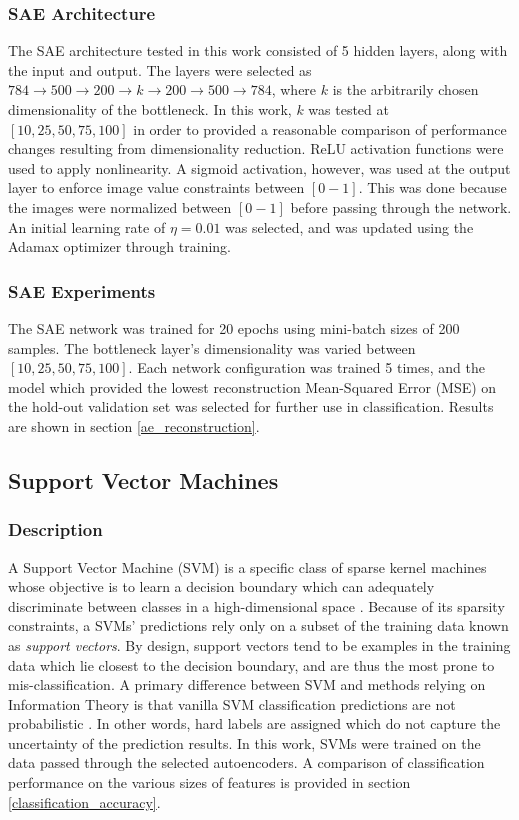 \documentclass[conference]{IEEEtran}
\begin{document}
  	\subsubsection*{SAE Architecture}
  	The SAE architecture tested in this work consisted of 5 hidden layers, along with the input and output.  The layers were selected as $784 \rightarrow 500 \rightarrow 200 \rightarrow k \rightarrow 200 \rightarrow 500 \rightarrow 784$, where $k$ is the arbitrarily chosen dimensionality of the bottleneck.  In this work, $k$ was tested at $[10,25,50,75,100]$ in order to provided a reasonable comparison of performance changes resulting from dimensionality reduction.  ReLU activation functions were used to apply nonlinearity.  A sigmoid activation, however, was used at the output layer to enforce image value constraints between $[0-1]$.  This was done because the images were normalized between $[0-1]$ before passing through the network.  An initial learning rate of $\eta=0.01$ was selected, and was updated using the Adamax optimizer through training.
  	
  	\subsubsection*{SAE Experiments}
  	The SAE network was trained for 20 epochs using mini-batch sizes of 200 samples.  The bottleneck layer's dimensionality was varied between $[10,25,50,75,100]$.  Each network configuration was trained 5 times, and the model which provided the lowest reconstruction  Mean-Squared Error (MSE) on the hold-out validation set was selected for further use in classification.  Results are shown in section \ref{ae_reconstruction}.
  	
	 \subsection{Support Vector Machines}
	 \subsubsection*{Description}
	 A Support Vector Machine (SVM) is a specific class of sparse kernel machines whose objective  is to learn a decision boundary which can adequately discriminate between classes in a high-dimensional space \cite{Lin2011svm,Sanchez2011svm}.  Because of its sparsity constraints, a SVMs' predictions rely only on a subset of the training data known as \textit{support vectors}. By design, support vectors tend to be examples in the training data which lie closest to the decision boundary, and are thus the most prone to mis-classification. A primary difference between SVM and methods relying on Information Theory is that vanilla SVM classification predictions are not probabilistic \cite{Murphy2012Textbook}.  In other words, hard labels are assigned which do not capture the uncertainty of the prediction results.  In this work, SVMs were trained on the data passed through the selected autoencoders.  A comparison of classification performance on the various sizes of features is provided in section \ref{classification_accuracy}.
	 
\end{document}
